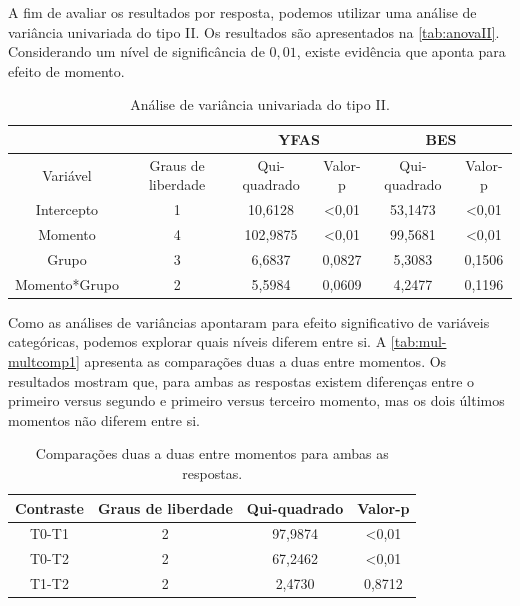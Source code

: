 \documentclass[AMA,STIX1COL]{WileyNJD-v2}
\begin{document}
A fim de avaliar os resultados por resposta, podemos utilizar uma análise de variância univariada do tipo II. Os resultados são apresentados na \autoref{tab:anovaII}. Considerando um nível de significância de $0,01$, existe evidência que aponta para efeito de momento.

\begin{table}[H]
\centering
\begin{tabular}{c|c|cc|cc}
\hline
              &                    & \multicolumn{2}{c|}{YFAS}     & \multicolumn{2}{c}{BES}       \\ \hline
Variável      & Graus de liberdade & Qui-quadrado & Valor-p        & Qui-quadrado & Valor-p        \\ \hline
Intercepto    & 1                  & 10,6128      & \textless 0,01 & 53,1473      & \textless 0,01 \\
Momento       & 4                  & 102,9875     & \textless 0,01 & 99,5681      & \textless 0,01 \\
Grupo         & 3                  & 6,6837       & 0,0827         & 5,3083       & 0,1506         \\
Momento*Grupo & 2                  & 5,5984       & 0,0609         & 4,2477       & 0,1196         \\ \hline
\end{tabular}
\caption{Análise de variância univariada do tipo II.}
\label{tab:anovaII}
\end{table}

Como as análises de variâncias apontaram para efeito significativo de variáveis categóricas, podemos explorar quais níveis diferem entre si. A \autoref{tab:mul-multcomp1} apresenta as comparações duas a duas entre momentos. Os resultados mostram que, para ambas as respostas existem diferenças entre o primeiro versus segundo e primeiro versus terceiro momento, mas os dois últimos momentos não diferem entre si.

\begin{table}[H]
\centering
\begin{tabular}{cccc}
\hline
Contraste & Graus de liberdade & Qui-quadrado & Valor-p        \\ \hline
T0-T1     & 2                  & 97,9874      & \textless 0,01 \\
T0-T2     & 2                  & 67,2462      & \textless 0,01 \\
T1-T2     & 2                  & 2,4730       & 0,8712         \\ \hline
\end{tabular}
\caption{Comparações duas a duas entre momentos para ambas as respostas.}
\label{tab:mul-multcomp1}
\end{table}
\end{document}
